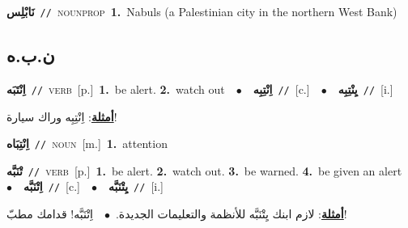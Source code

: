 \documentclass[10pt,a4paper,twoside]{article} %
\begin{document}
\begin{multicols}{2}
{\setlength\topsep{0pt}\textbf{\foreignlanguage{arabic}{نَابْلِس}}\ {\color{gray}\texttt{//}\color{black}}\ \textsc{noun\textunderscore prop}\ \textbf{1.}~Nabuls (a Palestinian city in the northern West Bank)\ } \vspace{2mm}

\vspace{-3mm}
\subsection*{\color{blue}\foreignlanguage{arabic}{ن.ب.ه}\color{blue}{}} 

{\setlength\topsep{0pt}\textbf{\foreignlanguage{arabic}{اِنْتَبَه}}\ {\color{gray}\texttt{//}\color{black}}\ \textsc{verb}\ [p.]\ \textbf{1.}~be alert.  \textbf{2.}~watch out\ \ $\bullet$\ \ \setlength\topsep{0pt}\textbf{\foreignlanguage{arabic}{اِنْتِبِه}}\ {\color{gray}\texttt{//}\color{black}}\ [c.]\ \ $\bullet$\ \ \setlength\topsep{0pt}\textbf{\foreignlanguage{arabic}{يِنْتِبِه}}\ {\color{gray}\texttt{//}\color{black}}\ [i.]\  \begin{flushright}\color{gray}\foreignlanguage{arabic}{\textbf{\underline{\foreignlanguage{arabic}{أمثلة}}}: اِنْتِبِه وراك سيارة!}\end{flushright}\color{black}} \vspace{2mm}

{\setlength\topsep{0pt}\textbf{\foreignlanguage{arabic}{اِنْتِبَاه}}\ {\color{gray}\texttt{//}\color{black}}\ \textsc{noun}\ [m.]\ \textbf{1.}~attention\ } \vspace{2mm}

{\setlength\topsep{0pt}\textbf{\foreignlanguage{arabic}{تْنَبَّه}}\ {\color{gray}\texttt{//}\color{black}}\ \textsc{verb}\ [p.]\ \textbf{1.}~be alert.  \textbf{2.}~watch out.  \textbf{3.}~be warned.  \textbf{4.}~be given an alert\ \ $\bullet$\ \ \setlength\topsep{0pt}\textbf{\foreignlanguage{arabic}{اِتْنَبَّه}}\ {\color{gray}\texttt{//}\color{black}}\ [c.]\ \ $\bullet$\ \ \setlength\topsep{0pt}\textbf{\foreignlanguage{arabic}{يِتْنَبَّه}}\ {\color{gray}\texttt{//}\color{black}}\ [i.]\  \begin{flushright}\color{gray}\foreignlanguage{arabic}{\textbf{\underline{\foreignlanguage{arabic}{أمثلة}}}: لازم ابنك يِتْنَبَّه للأنظمة والتعليمات الجديدة.\ $\bullet$\ \  اِتْنَبَّه! قدامك مطبّ!}\end{flushright}\color{black}} \vspace{2mm}


\end{multicols}
\end{document}
